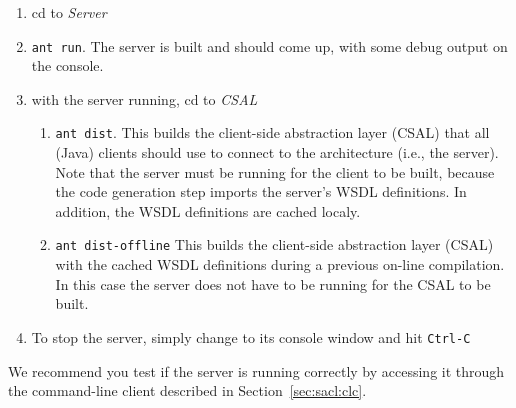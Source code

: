 \begin{enumerate}
  \item cd to \emph{Server}

  \item \texttt{ant run}. The server is built and should come up, with
    some debug output on the console.

  \item with the server running, cd to \emph{CSAL}

    \begin{enumerate}
    \item \texttt{ant dist}. This builds the client-side abstraction
      layer (CSAL) that all (Java) clients should use to connect to
      the architecture (i.e., the server). Note that the server must
      be running for the client to be built, because the code
      generation step imports the server's WSDL definitions. In
      addition, the WSDL definitions are cached localy.
      
      \item \texttt{ant dist-offline} This builds the client-side
      abstraction layer (CSAL) with the cached WSDL definitions during
      a previous on-line compilation.  In this case the server does
      not have to be running for the CSAL to be built.
    \end{enumerate}
    
  \item To stop the server, simply change to its console window and
    hit \texttt{Ctrl-C}
\end{enumerate}
We recommend you test if the server is running correctly by accessing
it through the command-line client described in Section~\ref{sec:sacl:clc}.




